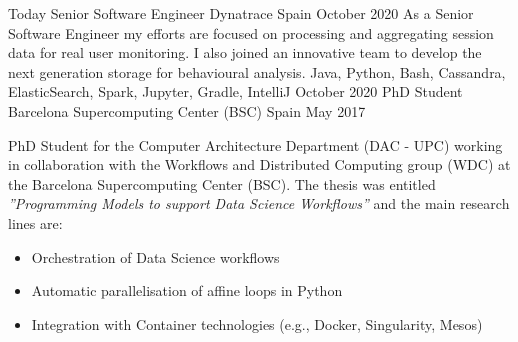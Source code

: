 %
%
%


\begin{experiences}
    \experience
        {Today}
        {Senior Software Engineer}
        {Dynatrace}
        {Spain}
        {October 2020}
        {As a Senior Software Engineer my efforts are focused on processing and aggregating session data for real user monitoring. I also joined an innovative team to develop the next generation storage for behavioural analysis.
        }
        {Java, Python, Bash, Cassandra, ElasticSearch, Spark, Jupyter, Gradle, IntelliJ}
    \emptySeparator
    \experience
        {October 2020}
        {PhD Student}
        {Barcelona Supercomputing Center (BSC)}
        {Spain}
        {May 2017}
        {PhD Student for the Computer Architecture Department (DAC - UPC) working in collaboration with the Workflows and Distributed Computing group (WDC) at the Barcelona Supercomputing Center (BSC). The thesis was entitled \textit{''Programming Models to support Data Science Workflows''} and the main research lines are:
        \begin{itemize}
            \item Orchestration of Data Science workflows
            \item Automatic parallelisation of affine loops in Python
            \item Integration with Container technologies (e.g., Docker, Singularity, Mesos)

\end{itemize}}
\end{experiences}
